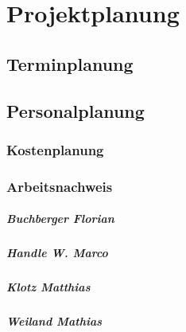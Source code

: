 \chapter[Anhang: Projektplanung]{Projektplanung}

\section{Terminplanung}

\section{Personalplanung}

\subsection{Kostenplanung}

\subsection{Arbeitsnachweis}

\paragraph{Buchberger Florian}

\paragraph{Handle W. Marco}

\paragraph{Klotz Matthias}

\paragraph{Weiland Mathias}